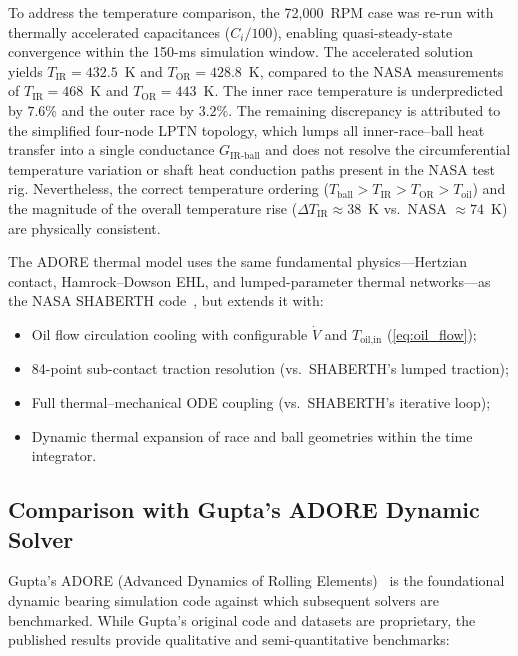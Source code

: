 \documentclass[preprint,12pt]{elsarticle}
\begin{document}
To address the temperature comparison, the 72{,}000~RPM case was re-run with thermally accelerated capacitances ($C_i / 100$), enabling quasi-steady-state convergence within the 150-ms simulation window. The accelerated solution yields $T_{\text{IR}} = 432.5$~K and $T_{\text{OR}} = 428.8$~K, compared to the NASA measurements of $T_{\text{IR}} = 468$~K and $T_{\text{OR}} = 443$~K. The inner race temperature is underpredicted by $7.6\%$ and the outer race by $3.2\%$. The remaining discrepancy is attributed to the simplified four-node LPTN topology, which lumps all inner-race--ball heat transfer into a single conductance $G_{\text{IR-ball}}$ and does not resolve the circumferential temperature variation or shaft heat conduction paths present in the NASA test rig. Nevertheless, the correct temperature ordering ($T_{\text{ball}} > T_{\text{IR}} > T_{\text{OR}} > T_{\text{oil}}$) and the magnitude of the overall temperature rise ($\Delta T_{\text{IR}} \approx 38$~K vs.\ NASA $\approx 74$~K) are physically consistent.

The ADORE thermal model uses the same fundamental physics---Hertzian contact, Hamrock--Dowson EHL, and lumped-parameter thermal networks---as the NASA SHABERTH code~\cite{Parker1984}, but extends it with:
\begin{itemize}
    \item Oil flow circulation cooling with configurable $\dot{V}$ and $T_{\text{oil,in}}$ (\cref{eq:oil_flow});
    \item 84-point sub-contact traction resolution (vs.\ SHABERTH's lumped traction);
    \item Full thermal--mechanical ODE coupling (vs.\ SHABERTH's iterative loop);
    \item Dynamic thermal expansion of race and ball geometries within the time integrator.
\end{itemize}


\subsection{Comparison with Gupta's ADORE Dynamic Solver}
\label{sec:gupta}

Gupta's ADORE (Advanced Dynamics of Rolling Elements)~\cite{Gupta1984} is the foundational dynamic bearing simulation code against which subsequent solvers are benchmarked. While Gupta's original code and datasets are proprietary, the published results provide qualitative and semi-quantitative benchmarks:
\end{document}
